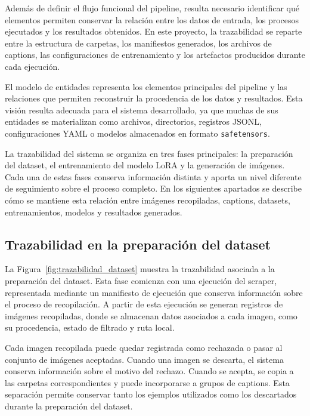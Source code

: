 \documentclass[a4paper,11pt,titlepage]{scrbook}
\begin{document}
Además de definir el flujo funcional del pipeline, resulta necesario identificar qué elementos permiten conservar la relación entre los datos de entrada, los procesos ejecutados y los resultados obtenidos. En este proyecto, la trazabilidad se reparte entre la estructura de carpetas, los manifiestos generados, los archivos de captions, las configuraciones de entrenamiento y los artefactos producidos durante cada ejecución.

\medskip

El modelo de entidades representa los elementos principales del pipeline y las relaciones que permiten reconstruir la procedencia de los datos y resultados. Esta visión resulta adecuada para el sistema desarrollado, ya que muchas de sus entidades se materializan como archivos, directorios, registros JSONL, configuraciones YAML o modelos almacenados en formato \texttt{safetensors}.

\medskip

La trazabilidad del sistema se organiza en tres fases principales: la preparación del dataset, el entrenamiento del modelo LoRA y la generación de imágenes. Cada una de estas fases conserva información distinta y aporta un nivel diferente de seguimiento sobre el proceso completo. En los siguientes apartados se describe cómo se mantiene esta relación entre imágenes recopiladas, captions, datasets, entrenamientos, modelos y resultados generados.

\subsection{Trazabilidad en la preparación del dataset}

La Figura~\ref{fig:trazabilidad_dataset} muestra la trazabilidad asociada a la preparación del dataset. Esta fase comienza con una ejecución del scraper, representada mediante un manifiesto de ejecución que conserva información sobre el proceso de recopilación. A partir de esta ejecución se generan registros de imágenes recopiladas, donde se almacenan datos asociados a cada imagen, como su procedencia, estado de filtrado y ruta local.

\medskip

Cada imagen recopilada puede quedar registrada como rechazada o pasar al conjunto de imágenes aceptadas. Cuando una imagen se descarta, el sistema conserva información sobre el motivo del rechazo. Cuando se acepta, se copia a las carpetas correspondientes y puede incorporarse a grupos de captions. Esta separación permite conservar tanto los ejemplos utilizados como los descartados durante la preparación del dataset.
\end{document}
